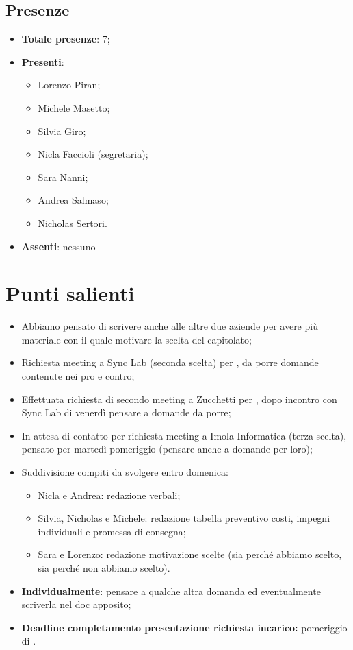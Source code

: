 \documentclass[11pt]{article}
\begin{document}
	\subsection{Presenze}
	\begin{itemize}
		\item \textbf{Totale presenze}: 7;
		\item \textbf{Presenti}:
		\begin{itemize}
			\item Lorenzo Piran; 
			\item Michele Masetto;
			\item Silvia Giro;
			\item Nicla Faccioli (segretaria);
			\item Sara Nanni;
			\item Andrea Salmaso;
			\item Nicholas Sertori.
		\end{itemize}
		\item \textbf{Assenti}: nessuno
	\end{itemize}

	\newpage

	\section{Punti salienti}
		\begin{itemize}
			\item Abbiamo pensato di scrivere anche alle altre due aziende per avere più materiale con il quale motivare la scelta del capitolato;
			\item Richiesta meeting a Sync Lab (seconda scelta) per \textbf{{\color{BrickRed}{venerdì 12 Novembre ore 16:00}}} , da porre domande contenute nei pro e contro;
			\item 	Effettuata richiesta di secondo meeting a Zucchetti per \textbf{{\color{BrickRed}{lunedì 15 Novembre ore 16:30}}}, dopo incontro con Sync Lab di venerdì pensare a domande da porre;
			\item In attesa di contatto per richiesta meeting a Imola Informatica (terza scelta), pensato per martedì pomeriggio (pensare anche a domande per loro);
			\item Suddivisione compiti da svolgere entro domenica:
				\begin{itemize}
					\item Nicla e Andrea: redazione verbali;
					\item Silvia, Nicholas e Michele: redazione tabella preventivo costi, impegni individuali e promessa di consegna;
					\item Sara e Lorenzo: redazione motivazione scelte (sia perché abbiamo scelto, sia perché non abbiamo scelto).
				\end{itemize}
			\item \textbf{Individualmente}: pensare a qualche altra domanda ed eventualmente scriverla nel doc apposito;
			\item \textbf{Deadline completamento presentazione richiesta incarico:} pomeriggio di \textbf{{\color{BrickRed}{mercoledì 17 Novembre}}} .
		\end{itemize}
	
	

	
	
	
	
	
	
	
	
\end{document}
